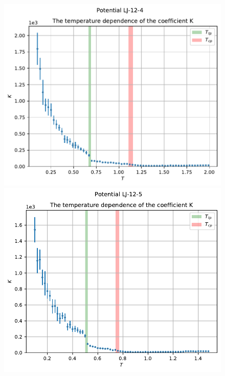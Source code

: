 \documentclass[pdf,hyperref={unicode}]{beamer}
\begin{document}
\begin{frame}
\transdissolve[duration=0.2]

\begin{columns}

\begin{column}{0.7\linewidth}
{
\begin{figure}[h]
\begin{center}
\begin{minipage}[h]{0.45\linewidth}
\includegraphics[width=\textwidth, keepaspectratio]{plot_K_Potential LJ-12-4_1}
\end{minipage}
\begin{minipage}[h]{0.45\linewidth}
\includegraphics[width=\textwidth, keepaspectratio]{plot_K_Potential LJ-12-5_1}
\end{minipage}


\end{center}
\end{figure}}
\end{column}
\end{columns}
\end{frame}
\end{document}
